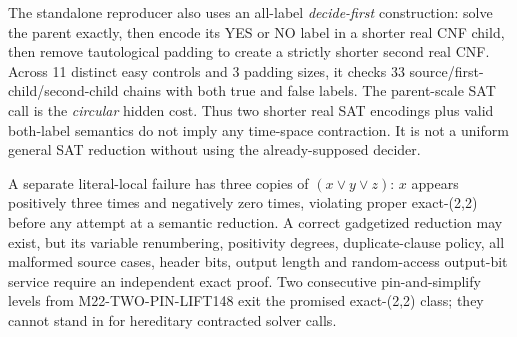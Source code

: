 \documentclass[11pt]{article}
\begin{document}
The standalone reproducer also uses an all-label
\emph{decide-first} construction: solve the parent exactly,
then encode its YES or NO label in a shorter real CNF child,
then remove tautological padding to create a strictly shorter
second real CNF. Across 11 distinct easy controls and 3
padding sizes, it checks 33 source/first-child/second-child
chains with both true and false labels.
The parent-scale SAT call is the \emph{circular} hidden cost.
Thus two shorter real SAT encodings plus valid both-label semantics
do not imply any time-space contraction. It is not a uniform
general SAT reduction without using the already-supposed decider.

A separate literal-local failure has three copies of
$(x\lor y\lor z)$: $x$ appears positively three times and
negatively zero times, violating proper exact-(2,2)
before any attempt at a semantic reduction. A correct gadgetized
reduction may exist, but its variable renumbering, positivity
degrees, duplicate-clause policy, all malformed source cases,
header bits, output length and random-access output-bit service
require an independent exact proof. Two consecutive pin-and-simplify
levels from M22-TWO-PIN-LIFT148 exit the promised exact-(2,2)
class; they cannot stand in for hereditary contracted solver calls.
\end{document}
